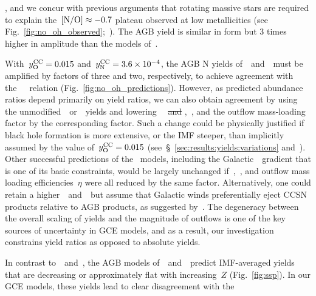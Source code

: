 \documentclass[ms.tex]{subfiles}
\begin{document}
\mbox{\citet{Limongi2018}}, and we concur with previous arguments that rotating
massive
stars are required to explain the~$\text{[N/O]} \approx -0.7$ plateau observed at low
metallicities (see Fig.~\ref{fig:no_oh_observed};~\citealp{Chiappini2003,
Chiappini2005, Chiappini2006, Kobayashi2011, Prantzos2018, Grisoni2021}).
The AGB yield is similar in form but 3 times higher in amplitude than the
models of~\cristallo.
\par
With~$y_\text{O}^\text{CC} = 0.015$ and~$y_\text{N}^\text{CC} = 3.6\times10^{-4}$, the AGB N yields
of~\cristallo~and~\ventura~must be amplified by factors of three and two,
respectively, to achieve agreement with
the~\mbox{\citet{Dopita2016}}~\ohno~relation (Fig.~\ref{fig:no_oh_predictions}).
However, as predicted abundance ratios depend primarily on yield ratios, we can
also obtain agreement by using the
{\color{red} unmodified}~\cristallo~or~\ventura~yields and
lowering~~{\color{red} \sout{and} ,}~, {\color{red} and the
outflow mass-loading factor} by the corresponding factor.
Such a change could be physically justified if black hole formation is more
extensive, or the IMF steeper, than implicitly assumed by the value
of~$y_\text{O}^\text{CC} = 0.015$ (see~\S~\ref{sec:results:yields:variations}
and~\mbox{\citealp{Griffith2021}}).
Other successful predictions of the~\mbox{\citet{Johnson2021}} models,
including the
Galactic~\oh~gradient that is one of its basic constraints, would be largely
unchanged if~,~, and outflow mass loading efficiencies~$\eta$
were all reduced by the same factor.
Alternatively, one could retain a higher~~and~~but assume that
Galactic winds preferentially eject CCSN products relative to AGB products, as
suggested by~\mbox{\citet{Vincenzo2016a}}.
The degeneracy between the overall scaling of yields and the magnitude of
outflows is one of the key sources of uncertainty in GCE models{\color{red},
and as a result, our investigation constrains yield ratios as opposed to
absolute yields.
}
\par
In contrast to~\cristallo~and~\ventura, the AGB models
of~\karakasten~and~\karakas~predict IMF-averaged yields that are decreasing or
approximately flat with increasing~$Z$ (Fig.~\ref{fig:ssp}).
In our GCE models, these yields lead to clear disagreement with the
\end{document}
